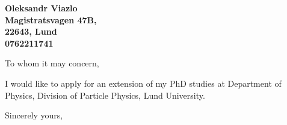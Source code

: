 \documentclass[11pt]{letter} %
\begin{document}

\begin{letter}{} 


\begin{center}
\large\bf Oleksandr Viazlo \\ %
Magistratsvagen 47B, \\ 22643, Lund \\ 0762211741 %
\end{center} 

\signature{Oleksandr Viazlo} %


\opening{To whom it may concern,} 

 I would like to apply for an extension of my PhD studies at Department of Physics, Division of Particle Physics, Lund University.

\closing{Sincerely yours,}



\end{letter}
\end{document}

